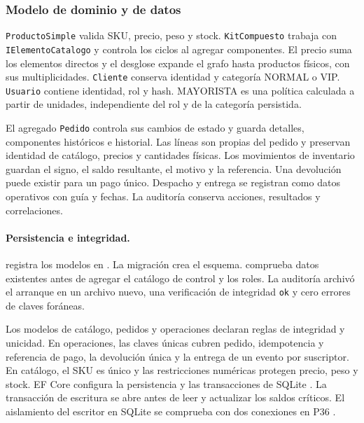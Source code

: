 \subsubsection{Modelo de dominio y de datos}
\texttt{ProductoSimple} valida SKU, precio, peso y stock. \texttt{KitCompuesto} trabaja con \texttt{IElementoCatalogo} y controla los ciclos al agregar componentes. El precio suma los elementos directos y el desglose expande el grafo hasta productos físicos, con sus multiplicidades. \texttt{Cliente} conserva identidad y categoría NORMAL o VIP. \texttt{Usuario} contiene identidad, rol y hash. MAYORISTA es una política calculada a partir de unidades, independiente del rol y de la categoría persistida.

El agregado \texttt{Pedido} controla sus cambios de estado y guarda detalles, componentes históricos e historial. Las líneas son propias del pedido y preservan identidad de catálogo, precios y cantidades físicas. Los movimientos de inventario guardan el signo, el saldo resultante, el motivo y la referencia. Una devolución puede existir para un pago único. Despacho y entrega se registran como datos operativos con guía y fechas. La auditoría conserva acciones, resultados y correlaciones.


\paragraph{Persistencia e integridad.}
 registra los modelos en . La migración  crea el esquema.  comprueba datos existentes antes de agregar el catálogo de control y los roles. La auditoría archivó el arranque en un archivo nuevo, una verificación de integridad \texttt{ok} y cero errores de claves foráneas.

Los modelos de catálogo, pedidos y operaciones declaran reglas de integridad y unicidad. En operaciones, las claves únicas cubren pedido, idempotencia y referencia de pago, la devolución única y la entrega de un evento por suscriptor. En catálogo, el SKU es único y las restricciones numéricas protegen precio, peso y stock. EF Core configura la persistencia y las transacciones de SQLite \cite{eftransaction,sqlitefk}. La transacción de escritura se abre antes de leer y actualizar los saldos críticos. El aislamiento del escritor en SQLite se comprueba con dos conexiones en P36 \cite{sqliteisolation}.

